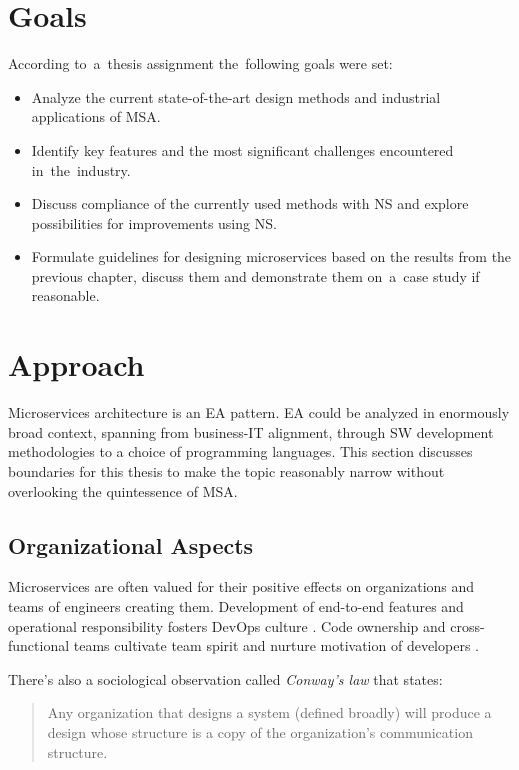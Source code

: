 \documentclass[thesis=M,english,hidelinks]{FITthesis}[2012/10/20]
\begin{document}
\section{Goals}
According to~a~thesis assignment the~following goals were set:
\begin{itemize}
	\item Analyze the current state-of-the-art design methods and industrial applications of \acrfull{MSA}.
	\item Identify key features and the most significant challenges encountered in~the~industry.
	\item Discuss compliance of the currently used methods with \acrfull{NS} and explore possibilities for improvements using \acrshort{NS}. 
	\item Formulate guidelines for designing microservices based on the results from the previous chapter, discuss them and demonstrate them on~a~case study if reasonable.
\end{itemize}

\section{Approach}
Microservices architecture is an \acrfull{EA} pattern. \acrshort{EA} could be analyzed in enormously broad context, spanning from business-IT alignment, through \acrshort{SW} development methodologies to a choice of programming languages. This section discusses boundaries for this thesis to make the topic reasonably narrow without overlooking the quintessence of \acrlong{MSA}.

\subsection{Organizational Aspects}
Microservices are often valued for their positive effects on organizations and teams of engineers creating them. Development of end-to-end features and operational responsibility fosters DevOps culture \cite{devops-what-is}. Code ownership and cross-functional teams cultivate team spirit and nurture motivation of developers \cite{ms-fow-new-term-def, ms-modelling-with-petter, ms-building-ms}.

There's also a sociological observation called \textit{Conway's law} that states:
\begin{quote}
    Any organization that designs a system (defined broadly) will produce a design whose structure is a copy of the organization's communication structure.~\cite{conways-law}
\end{quote}
\end{document}
